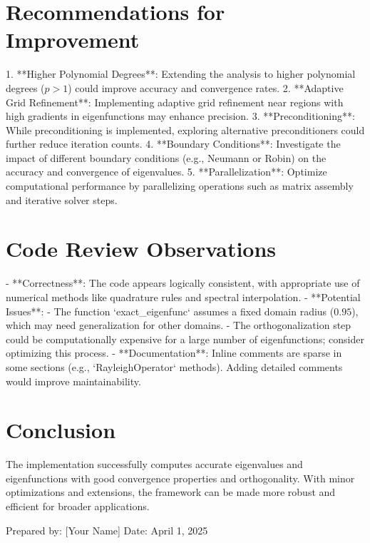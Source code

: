 \documentclass[12pt]{article}
\begin{document}
\section*{Recommendations for Improvement}
1. **Higher Polynomial Degrees**: Extending the analysis to higher polynomial degrees (\(p > 1\)) could improve accuracy and convergence rates.
2. **Adaptive Grid Refinement**: Implementing adaptive grid refinement near regions with high gradients in eigenfunctions may enhance precision.
3. **Preconditioning**: While preconditioning is implemented, exploring alternative preconditioners could further reduce iteration counts.
4. **Boundary Conditions**: Investigate the impact of different boundary conditions (e.g., Neumann or Robin) on the accuracy and convergence of eigenvalues.
5. **Parallelization**: Optimize computational performance by parallelizing operations such as matrix assembly and iterative solver steps.

\section*{Code Review Observations}
- **Correctness**: The code appears logically consistent, with appropriate use of numerical methods like quadrature rules and spectral interpolation.
- **Potential Issues**:
  - The function `exact_eigenfunc` assumes a fixed domain radius (\(0.95\)), which may need generalization for other domains.
  - The orthogonalization step could be computationally expensive for a large number of eigenfunctions; consider optimizing this process.
- **Documentation**: Inline comments are sparse in some sections (e.g., `RayleighOperator` methods). Adding detailed comments would improve maintainability.

\section*{Conclusion}
The implementation successfully computes accurate eigenvalues and eigenfunctions with good convergence properties and orthogonality. With minor optimizations and extensions, the framework can be made more robust and efficient for broader applications.

\vspace{1cm}

\noindent Prepared by: [Your Name]  
Date: April 1, 2025
\end{document}
